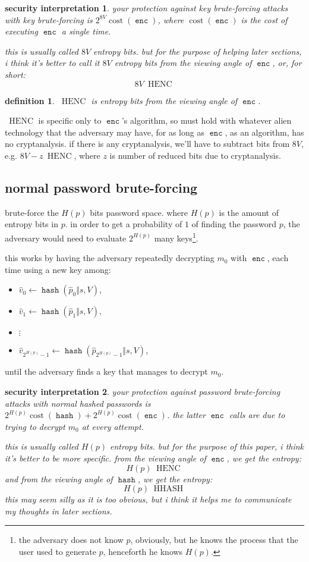 \documentclass[twocolumn]{article}
\newtheorem{security}{security interpretation}
\newtheorem{definition}{definition}
\DeclareMathOperator{\enc}{\mathtt{enc}}
\DeclareMathOperator{\hash}{\mathtt{hash}}
\DeclareMathOperator{\cost}{cost}
\DeclareMathOperator{\henc}{\; HENC}
\DeclareMathOperator{\hhash}{\; HHASH}
\begin{document}
\begin{security}
your protection against key brute-forcing attacks with key brute-forcing is
$2^{8V} \cost(\enc)$, where $\cost(\enc)$ is the cost of executing $\enc$ a
single time.  

this is usually called $8V$ \emph{entropy bits}.  but for the purpose of
helping later sections, i think it's better to call it $8V$ \emph{entropy
bits from the viewing angle of $\enc$}, or, for short:
\[
    8V \henc
\]
\end{security}

\begin{definition}
$\henc$ is entropy bits from the viewing angle of $\enc$.
\end{definition}

$\henc$  is specific only to $\enc$'s algorithm, so must hold with whatever
alien technology that the adversary may have, for as long as $\enc$, as an
algorithm, has no cryptanalysis.  if there is any cryptanalysis, we'll have
to subtract bits from $8V$, e.g. $8V
- z \henc$, where $z$ is number of reduced bits due to cryptanalysis.

\subsection{normal password brute-forcing}
brute-force the $H(p)$ bits password space.  where $H(p)$ is the amount of
entropy bits in $p$.  in order to get a probability of $1$ of finding the
password $p$, the adversary would need to evaluate $2^{H(p)}$ many
keys\footnote{the adversary does not know $p$, obviously, but he knows the
process that the user used to generate $p$, henceforth he knows $H(p)$.}.

this works by having the adversary repeatedly decrypting $m_0$ with $\enc$,
each time using a new key among:
\begin{itemize}
    \item $\hat v_0 \gets \hash(\hat p_0 \Vert s, V)$,
    \item $\hat v_1 \gets \hash(\hat p_1 \Vert s, V)$,
    \item $\vdots$
    \item $\hat v_{2^{H(p)}-1} \gets \hash(\hat p_{2^{H(p)}-1} \Vert s,
    V)$,
\end{itemize}
until the adversary finds a key that manages to decrypt $m_0$.

\begin{security}
your protection against password brute-forcing attacks with normal hashed
passwords is $2^{H(p)} \cost(\hash) + 2^{H(p)} \cost(\enc)$.  the latter
$\enc$ calls are due to trying to decrypt $m_0$ at every attempt.

this is usually called $H(p)$ \emph{entropy bits}.  but for the purpose of
this paper, i think it's better to be more specific.  from the viewing
angle of $\enc$, we get the entropy:
\[
    H(p) \henc
\]
and from the viewing angle of $\hash$, we get the entropy:
\[
    H(p) \hhash
\]
this may seem silly as it is too obvious, but i think it helps me to
communicate my thoughts in later sections.
\end{security}
\end{document}
